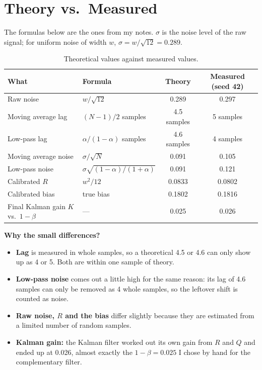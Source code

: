 \documentclass[11pt,a4paper]{article}
\begin{document}
\section{Theory vs.\ Measured}
The formulas below are the ones from my notes. $\sigma$ is the noise level of the raw signal; for uniform noise
of width $w$, $\sigma = w/\sqrt{12} = 0.289$.

\begin{table}[H]
\centering
\caption{Theoretical values against measured values.}
\begin{tabular}{llcc}
\toprule
What & Formula & Theory & Measured (seed 42) \\
\midrule
Raw noise                     & $w/\sqrt{12}$                      & 0.289        & 0.297 \\
Moving average lag            & $(N-1)/2$ samples                  & 4.5 samples  & 5 samples \\
Low-pass lag                  & $\alpha/(1-\alpha)$ samples        & 4.6 samples  & 4 samples \\
Moving average noise          & $\sigma/\sqrt{N}$                  & 0.091        & 0.105 \\
Low-pass noise                & $\sigma\sqrt{(1-\alpha)/(1+\alpha)}$ & 0.091      & 0.121 \\
Calibrated $R$                & $w^2/12$                           & 0.0833       & 0.0802 \\
Calibrated bias               & true bias                          & 0.1802       & 0.1816 \\
Final Kalman gain $K$ vs.\ $1-\beta$ & ---                         & 0.025        & 0.026 \\
\bottomrule
\end{tabular}
\end{table}

\textbf{Why the small differences?}
\begin{itemize}
  \item \textbf{Lag} is measured in whole samples, so a theoretical 4.5 or 4.6 can only show up as 4 or 5.
        Both are within one sample of theory.
  \item \textbf{Low-pass noise} comes out a little high for the same reason: its lag of 4.6 samples can only be
        removed as 4 whole samples, so the leftover shift is counted as noise.
  \item \textbf{Raw noise, $R$ and the bias} differ slightly because they are estimated from a limited number of
        random samples.
  \item \textbf{Kalman gain:} the Kalman filter worked out its own gain from $R$ and $Q$ and ended up at 0.026,
        almost exactly the $1-\beta = 0.025$ I chose by hand for the complementary filter.
\end{itemize}
\end{document}
